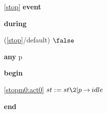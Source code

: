 \noindent \ref{stop}  \textbf{event}
\begin{block}
  \item   \textbf{during}
  \begin{block}
  \item[ (\ref{stop}/default) ]{$\false$} %
  \end{block}
  \item   \textbf{any} p
  \item   \textbf{begin}
  \begin{block}
  \item[ \eqref{stopm0:act0} ]{$st \bcmeq st \2| p \fun idle $} %
  \end{block}
  \item   \textbf{end} \\
\end{block}
